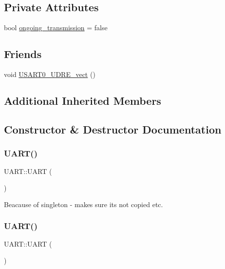 \subsection*{Private Attributes}
\begin{DoxyCompactItemize}
\item 
bool \hyperlink{class_u_a_r_t_ae98e7d277a1833478aa85dc9e686150a}{ongoing\+\_\+transmission} = false
\end{DoxyCompactItemize}
\subsection*{Friends}
\begin{DoxyCompactItemize}
\item 
void \hyperlink{class_u_a_r_t_accc13d37cd82c841e387e1d5cf4d9a94}{U\+S\+A\+R\+T0\+\_\+\+U\+D\+R\+E\+\_\+vect} ()
\end{DoxyCompactItemize}
\subsection*{Additional Inherited Members}


\subsection{Constructor \& Destructor Documentation}
\hypertarget{class_u_a_r_t_a97debffc29b178c09b104f4542298a36}{}\label{class_u_a_r_t_a97debffc29b178c09b104f4542298a36} 
\subsubsection{\texorpdfstring{U\+A\+R\+T()}{UART()}\hspace{0.1cm}{\footnotesize\ttfamily [1/2]}}
{\footnotesize\ttfamily U\+A\+R\+T\+::\+U\+A\+RT (\begin{DoxyParamCaption}\item[{const \hyperlink{class_u_a_r_t}{U\+A\+RT} \&}]{ }\end{DoxyParamCaption})\hspace{0.3cm}{\ttfamily [delete]}}

Beacause of singleton -\/ makes sure its not copied etc. \hypertarget{class_u_a_r_t_a68e7e88d2a13f5da85f0fde1ef98515f}{}\label{class_u_a_r_t_a68e7e88d2a13f5da85f0fde1ef98515f} 
\subsubsection{\texorpdfstring{U\+A\+R\+T()}{UART()}\hspace{0.1cm}{\footnotesize\ttfamily [2/2]}}
{\footnotesize\ttfamily U\+A\+R\+T\+::\+U\+A\+RT (\begin{DoxyParamCaption}{ }\end{DoxyParamCaption})\hspace{0.3cm}{\ttfamily [private]}}


